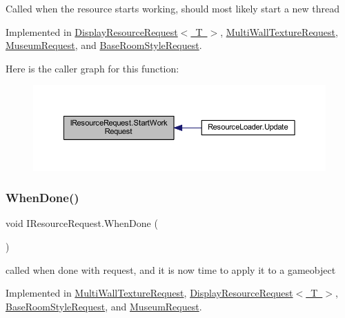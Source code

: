 Called when the resource starts working, should most likely start a new thread 



Implemented in \mbox{\hyperlink{class_display_resource_request_ab447f9d42e473b8bc8839c6f3d306a17}{Display\+Resource\+Request$<$ T $>$}}, \mbox{\hyperlink{class_multi_wall_texture_request_a9990230b6a9cb6be581b7948f379065b}{Multi\+Wall\+Texture\+Request}}, \mbox{\hyperlink{class_museum_request_a41b1a4699551a86415a877d5380febe1}{Museum\+Request}}, and \mbox{\hyperlink{class_base_room_style_request_af2ac2de206ad154351cf6a1b1e7befd5}{Base\+Room\+Style\+Request}}.

Here is the caller graph for this function\+:
\nopagebreak
\begin{figure}[H]
\begin{center}
\leavevmode
\includegraphics[width=350pt]{interface_i_resource_request_a5b40a09cb820283600ac9e3f846936f9_icgraph}
\end{center}
\end{figure}
\mbox{\label{interface_i_resource_request_a056e427fa6233602456ccb2d4c405aa0}} 
\subsubsection{\texorpdfstring{When\+Done()}{WhenDone()}}
{\footnotesize\ttfamily void I\+Resource\+Request.\+When\+Done (\begin{DoxyParamCaption}{ }\end{DoxyParamCaption})}



called when done with request, and it is now time to apply it to a gameobject 



Implemented in \mbox{\hyperlink{class_multi_wall_texture_request_a96afd031b54eb8f09658fa1930b7d7f7}{Multi\+Wall\+Texture\+Request}}, \mbox{\hyperlink{class_display_resource_request_a60a8a75088ba20c6c42ebcab8309f1de}{Display\+Resource\+Request$<$ T $>$}}, \mbox{\hyperlink{class_base_room_style_request_ad87356fc17614818e1713857f8901a2a}{Base\+Room\+Style\+Request}}, and \mbox{\hyperlink{class_museum_request_af34f7bf3bc637d500983a44272577a2e}{Museum\+Request}}.

